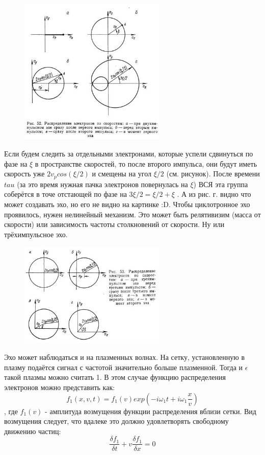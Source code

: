 \documentclass[10pt, a4paper]{article}
\begin{document}
\begin{figure}[h!]
	\begin{center}
		\includegraphics[width=70mm]{Echo_2_18.3.JPG}
	\end{center}
\end{figure}

Если будем следить за отдельными электронами, которые успели сдвинуться по фазе на $\xi$ в пространстве скоростей, то после второго импульса, они будут иметь скорость уже $2 v_p cos(\xi /2)$ и смещены на угол $\xi /2$ (см. рисунок). После времени $tau$ (за это время нужная пачка электронов повернулась на $\xi$) ВСЯ эта группа соберётся в точе отстающей по фазе на $3\xi/2 =\xi /2 + \xi $ .  А из рис. г. видно что может создавать эхо, но его не видно на картинке :D.
Чтобы циклотронное эхо проявилось, нужен нелинейный механизм. Это может быть релятивизим (масса от скорости) или зависимость частоты столкновений от скорости. Ну или трёхимпульсное эхо. 

\begin{figure}[h!]
	\begin{center}
		\includegraphics[width=70mm]{Echo_3_18.3.JPG}
	\end{center}
\end{figure}

Эхо может наблюдаться и на плазменных волнах.
На сетку, установленную в плазму подаётся сигнал с частотой значительно больше плазменной. Тогда и $\epsilon$ такой плазмы можно считать 1. В этом случае функцию распределения электронов можно представить как:
\begin{equation}
	f_1 (x,v,t)=f_1 (v) exp(-i \omega_1 t + i \omega_1 \frac{x}{v})
\end{equation}
, где  $f_1 (v)$ - амплитуда возмущения функции распределения вблизи сетки. Вид возмущения следует, что вдалеке это должно удовлетворять свободному движению частиц:
\begin{equation}
	\frac{\delta f_1}{\delta t} + v \frac{\delta f_1}{\delta x} =0
\end{equation}
\end{document}
